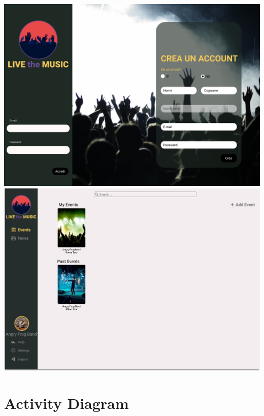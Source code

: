 \documentclass[11pt,a4paper]{article}
\begin{document}
\begin{itemize}
\includegraphics[scale=0.25]{Login.jpg}
\includegraphics[scale=0.25]{AddEvent.jpg}
\section{Activity Diagram}

\end{itemize}
\end{document}
